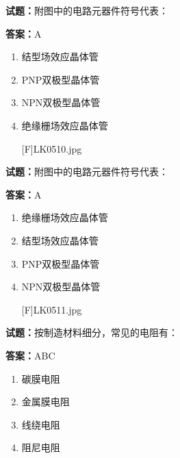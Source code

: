 \documentclass{ctexbook}
\begin{document}




\vspace{1em}

\textbf{试题：}附图中的电路元器件符号代表： 

\textbf{答案：}A 

\begin{enumerate}[leftmargin=3em]
  \item 结型场效应晶体管 

  \item PNP双极型晶体管 

  \item NPN双极型晶体管 

  \item 绝缘栅场效应晶体管 

[F]LK0510.jpg 

\end{enumerate}





\vspace{1em}

\textbf{试题：}附图中的电路元器件符号代表： 

\textbf{答案：}A 

\begin{enumerate}[leftmargin=3em]
  \item 绝缘栅场效应晶体管 

  \item 结型场效应晶体管 

  \item PNP双极型晶体管 

  \item NPN双极型晶体管 

[F]LK0511.jpg 

\end{enumerate}





\vspace{1em}

\textbf{试题：}按制造材料细分，常见的电阻有： 

\textbf{答案：}ABC 

\begin{enumerate}[leftmargin=3em]
  \item 碳膜电阻 

  \item 金属膜电阻 

  \item 线绕电阻 

  \item 阻尼电阻 

\end{enumerate}
\end{document}
